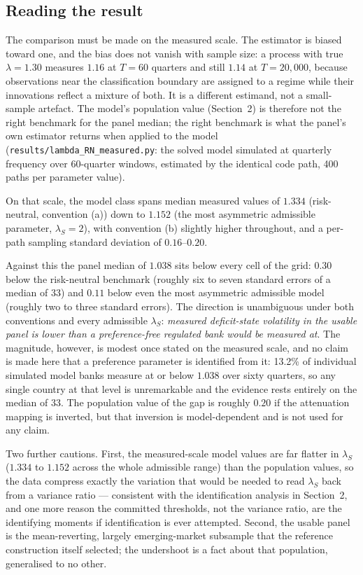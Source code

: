 \documentclass[11pt]{article}
\begin{document}
\subsection{Reading the result}

The comparison must be made on the measured scale. The estimator is
biased toward one, and the bias does not vanish with sample size: a
process with true $\lambda=1.30$ measures $1.16$ at $T=60$ quarters and
still $1.14$ at $T=20{,}000$, because observations near the
classification boundary are assigned to a regime while their innovations
reflect a mixture of both. It is a different estimand, not a small-sample
artefact. The model's population value (Section~2) is therefore not the
right benchmark for the panel median; the right benchmark is what the
panel's own estimator returns when applied to the model
(\texttt{results/lambda\_RN\_measured.py}: the solved model simulated at
quarterly frequency over 60-quarter windows, estimated by the identical
code path, 400 paths per parameter value).

On that scale, the model class spans median measured values of
$\mathbf{1.334}$ (risk-neutral, convention (a)) down to $\mathbf{1.152}$
(the most asymmetric admissible parameter, $\lambda_S=2$), with
convention (b) slightly higher throughout, and a per-path sampling
standard deviation of $0.16$--$0.20$.

Against this the panel median of $1.038$ sits below every cell of the
grid: $0.30$ below the risk-neutral benchmark (roughly six to seven
standard errors of a median of 33) and $0.11$ below even the most
asymmetric admissible model (roughly two to three standard errors). The
direction is unambiguous under both conventions and every admissible
$\lambda_S$: \emph{measured deficit-state volatility in the usable panel
is lower than a preference-free regulated bank would be measured at}.
The magnitude, however, is modest once stated on the measured scale, and
no claim is made here that a preference parameter is identified from it:
13.2\% of individual simulated model banks measure at or below $1.038$
over sixty quarters, so any single country at that level is unremarkable
and the evidence rests entirely on the median of 33. The population
value of the gap is roughly $0.20$ if the attenuation mapping is
inverted, but that inversion is model-dependent and is not used for any
claim.

Two further cautions. First, the measured-scale model values are far
flatter in $\lambda_S$ ($1.334$ to $1.152$ across the whole admissible
range) than the population values, so the data compress exactly the
variation that would be needed to read $\lambda_S$ back from a variance
ratio --- consistent with the identification analysis in Section~2, and
one more reason the committed thresholds, not the variance ratio, are
the identifying moments if identification is ever attempted. Second, the
usable panel is the mean-reverting, largely emerging-market subsample
that the reference construction itself selected; the undershoot is a
fact about that population, generalised to no other.
\end{document}
